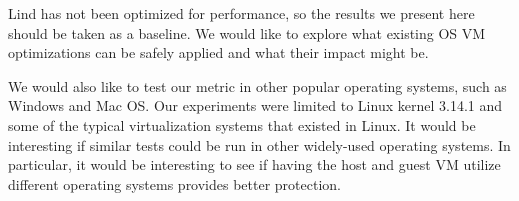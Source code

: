 
Lind has not been optimized for performance, so the results we present here should be taken as a baseline.
We would like to explore what existing OS VM optimizations can be safely applied
and what their impact might be.

We would also like to test our metric in other popular operating systems, such as Windows and Mac OS. Our experiments were limited to Linux kernel 3.14.1 and some of the typical virtualization systems that existed in Linux. It would be interesting
if similar tests could be run in other widely-used operating systems. In particular, it would be interesting to see if having the host and guest VM utilize different operating systems provides better protection.
